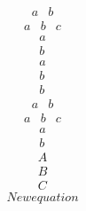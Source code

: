 \documentclass{article}
\begin{document}
\begin{equation}  \left.\begin{array}{ll}a&b\end{array}\right.  \end{equation}
\begin{equation}  \left.\begin{array}{lll}a&b&c\end{array}\right.  \end{equation}
\begin{equation}  \left.\begin{array}{ll}a\\b\end{array}\right.  \end{equation}
\begin{equation}  \left.\begin{array}{lll}a\\b\\b\end{array}\right.  \end{equation}
\begin{equation}  \left.\begin{array}{cc}a&b\end{array}\right.  \end{equation}
\begin{equation}  \left.\begin{array}{ccc}a&b&c\end{array}\right.  \end{equation}
\begin{equation}  \left.\begin{array}{cc}a\\b\end{array}\right.  \end{equation}
\begin{equation}  \left.\begin{array}{ccc}A\\B\\C\end{array}\right.  \end{equation}
\begin{equation} New equation \end{equation}
\end{document}
